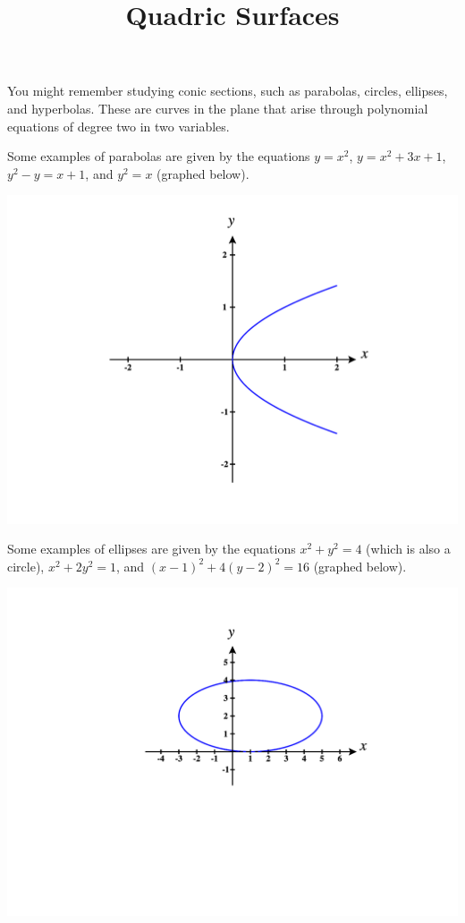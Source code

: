 \documentclass{ximera}
\title{Quadric Surfaces}
\begin{document}
\begin{abstract}
\end{abstract}
\maketitle


You might remember studying conic sections, such as parabolas, circles, ellipses, and hyperbolas. These are curves in the plane that arise through polynomial equations of degree two in two variables.

Some examples of parabolas are given by the equations $y=x^2$, $y=x^2+3x+1$, $y^2-y=x+1$, and $y^2=x$ (graphed below).

\begin{image}
\includegraphics[width = \textwidth]{CalcPlot3D-parabola}
\end{image}

Some examples of ellipses are given by the equations $x^2+y^2=4$ (which is also a circle), $x^2+2y^2=1$, and $(x-1)^2+4(y-2)^2=16$ (graphed below).

\begin{image}
\includegraphics[width = \textwidth]{CalcPlot3D-ellipse}
\end{image}
\end{document}
